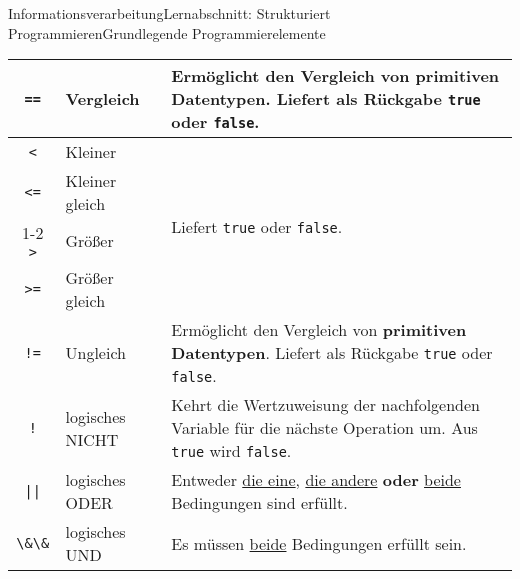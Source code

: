 \documentclass[11pt,oneside,openany,headings=optiontotoc,11pt,numbers=noenddot]{article}
\begin{document}
\begin{worksheet}{Informationsverarbeitung}{Lernabschnitt: Strukturiert Programmieren}{Grundlegende Programmierelemente}
\begin{tabularx}{\textwidth}{cXX}
			\hline
			{\lstinline[style=JavaInputStyle]{==}} & Vergleich & Ermöglicht den Vergleich von \textbf{primitiven Datentypen}. Liefert als Rückgabe {\lstinline[style=JavaInputStyle]{true}} oder {\lstinline[style=JavaInputStyle]{false}}.\\
			\hline
			{\lstinline[style=JavaInputStyle]{<}} & Kleiner & \multirow{4}{*}{Liefert {\lstinline[style=JavaInputStyle]{true}} oder {\lstinline[style=JavaInputStyle]{false}}.}\\
			\cline{1-2}
			{\lstinline[style=JavaInputStyle]{<=}} & Kleiner gleich & \\
			\cline{1-2}
			{\lstinline[style=JavaInputStyle]{>}} & Größer & \\
			\cline{1-2}
			{\lstinline[style=JavaInputStyle]{>=}} & Größer gleich & \\
			\hline
			{\lstinline[style=JavaInputStyle]{!=}} & Ungleich & Ermöglicht den Vergleich von \textbf{primitiven Datentypen}. Liefert als Rückgabe {\lstinline[style=JavaInputStyle]{true}} oder {\lstinline[style=JavaInputStyle]{false}}.\\
			\hline
			{\lstinline[style=JavaInputStyle]{!}} & logisches NICHT & Kehrt die Wertzuweisung der nachfolgenden Variable für die nächste Operation um. Aus {\lstinline[style=JavaInputStyle]{true}} wird {\lstinline[style=JavaInputStyle]{false}}.\\
			\hline
			{\lstinline[style=JavaInputStyle]{||}} & logisches ODER & Entweder \underline{die eine}, \underline{die andere} \textbf{oder} \underline{beide} Bedingungen sind erfüllt.\\
			\hline
			{\lstinline[style=JavaInputStyle]{\&\&}} & logisches UND & Es müssen \underline{beide} Bedingungen erfüllt sein.\\
			\hline
			\hline
		\end{tabularx}\\
		\par\noindent

\end{worksheet}
\end{document}
